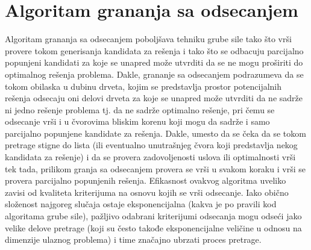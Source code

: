 \documentclass[12pt,oneside]{memoir}
\begin{document}
\section{Algoritam grananja sa odsecanjem}
Algoritam grananja sa odsecanjem poboljšava tehniku grube sile tako što vrši provere tokom generisanja
kandidata za rešenja i tako što se odbacuju parcijalno popunjeni kandidati za koje se unapred može utvrditi
da se ne mogu proširiti do optimalnog rešenja problema. Dakle, grananje sa odsecanjem podrazumeva da se tokom
obilaska u dubinu drveta, kojim se predstavlja prostor potencijalnih rešenja odsecaju oni delovi drveta za koje se unapred
može utvrditi da ne sadrže ni jedno rešenje problema tj. da ne sadrže optimalno rešenje, pri čemu se odsecanje vrši
i u čvorovima bliskim korenu koji mogu da sadrže i samo parcijalno popunjene kandidate za rešenja.
Dakle, umesto da se čeka da se tokom pretrage stigne do lista (ili eventualno unutrašnjeg čvora koji predstavlja
nekog kandidata za rešenje) i da se provera zadovoljenosti uslova ili optimalnosti vrši tek tada, prilikom granja sa
odsecanjem provera se vrši u svakom koraku i vrši se provera parcijalno popunjenih rešenja.
Efikasnost ovakvog algoritma uveliko zavisi od kvaliteta kriterijuma na osnovu kojih se vrši odsecanje. Iako obično
složenost najgoreg slučaja ostaje eksponencijalna (kakva je po pravili kod algoritama grube sile), pažljivo odabrani
kriterijumi odsecanja mogu odseći jako velike delove pretrage (koji su često takođe eksponencijalne veličine u odnosu
na dimenzije ulaznog problema) i time značajno ubrzati proces pretrage.
\end{document}
